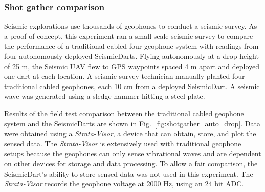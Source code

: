 \subsubsection{Shot gather comparison} 
Seismic explorations use thousands of geophones to conduct a seismic survey. 
 As a proof-of-concept, this experiment ran a small-scale seismic survey to compare the performance of a traditional cabled four geophone system with readings from four autonomously deployed SeismicDarts.
Flying autonomously at a drop height of 25 m, the Seismic UAV flew to GPS waypoints spaced 4 m apart and deployed one dart at each location. 
A seismic survey technician manually planted four traditional cabled geophones, each 10 cm from a deployed SeismicDart. 
A seismic wave was generated using a sledge hammer hitting a steel plate.

Results of the field test comparison between the traditional cabled geophone system and the SeismicDarts are shown in Fig.~\ref{fig:shotgather_auto_drop}.   
Data were obtained using a \emph{Strata-Visor}, a device that can obtain, store, and plot the sensed data. 
The \emph{Strata-Visor} is extensively used with traditional geophone setups because the geophones can only sense vibrational waves and are dependent on other devices for storage and data processing. 
To allow a fair comparison, the SeismicDart's  ability to store sensed data was not used in this experiment. 
 The \emph{Strata-Visor} records the geophone voltage at 2000 Hz, using an 24 bit ADC.


